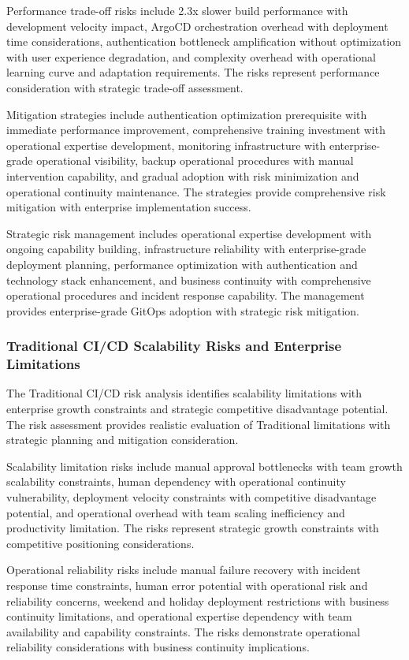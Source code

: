 Performance trade-off risks include 2.3x slower build performance with development velocity impact, ArgoCD orchestration overhead with deployment time considerations, authentication bottleneck amplification without optimization with user experience degradation, and complexity overhead with operational learning curve and adaptation requirements. The risks represent performance consideration with strategic trade-off assessment.

Mitigation strategies include authentication optimization prerequisite with immediate performance improvement, comprehensive training investment with operational expertise development, monitoring infrastructure with enterprise-grade operational visibility, backup operational procedures with manual intervention capability, and gradual adoption with risk minimization and operational continuity maintenance. The strategies provide comprehensive risk mitigation with enterprise implementation success.

Strategic risk management includes operational expertise development with ongoing capability building, infrastructure reliability with enterprise-grade deployment planning, performance optimization with authentication and technology stack enhancement, and business continuity with comprehensive operational procedures and incident response capability. The management provides enterprise-grade GitOps adoption with strategic risk mitigation.

\subsubsection{Traditional CI/CD Scalability Risks and Enterprise Limitations}

The Traditional CI/CD risk analysis identifies scalability limitations with enterprise growth constraints and strategic competitive disadvantage potential. The risk assessment provides realistic evaluation of Traditional limitations with strategic planning and mitigation consideration.

Scalability limitation risks include manual approval bottlenecks with team growth scalability constraints, human dependency with operational continuity vulnerability, deployment velocity constraints with competitive disadvantage potential, and operational overhead with team scaling inefficiency and productivity limitation. The risks represent strategic growth constraints with competitive positioning considerations.

Operational reliability risks include manual failure recovery with incident response time constraints, human error potential with operational risk and reliability concerns, weekend and holiday deployment restrictions with business continuity limitations, and operational expertise dependency with team availability and capability constraints. The risks demonstrate operational reliability considerations with business continuity implications.

